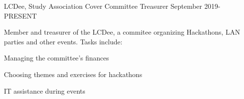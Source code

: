 
\begin{cventries}
  \cventry
    {LCDee, Study Association Cover}
    {Committee Treasurer} %
    {} %
    {September 2019-PRESENT} %
    {
        Member and treasurer of the LCDee, a commitee organizing Hackathons, LAN parties and other events. Tasks include:\vspace{1.5em}
      \begin{cvitems} %
        \item {Managing the committee's finances}
        \item {Choosing themes and exercises for hackathons}
        \item {IT assistance during events}
      \end{cvitems}
    }
\end{cventries}
